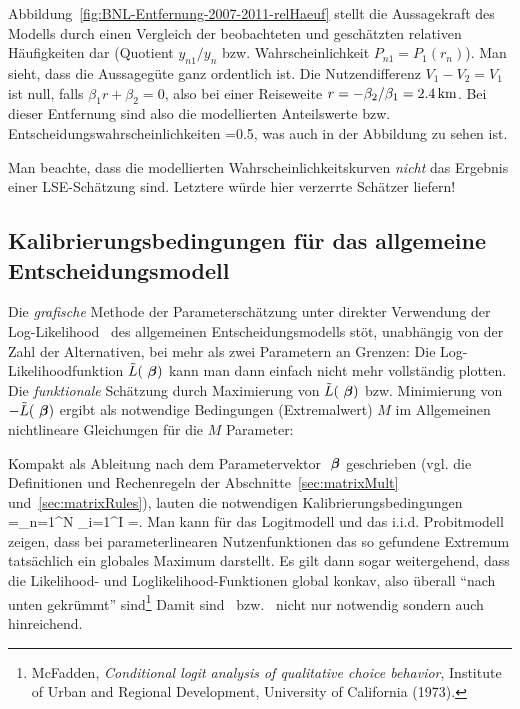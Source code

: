Abbildung~\ref{fig:BNL-Entfernung-2007-2011-relHaeuf} stellt die
Aussagekraft des Modells durch einen Vergleich der beobach\-te\-ten
und gesch\"atzten relativen
H\"aufigkeiten dar (Quotient $y_{n1}/y_n$ bzw. Wahrscheinlichkeit
$P_{n1}=P_1(r_n)$). Man sieht, dass die
Aussageg\"ute ganz ordentlich ist. Die Nutzendifferenz
 $V_1-V_2=V_1$ ist null, falls $\beta_1
  r+\beta_2=0$, also bei einer Reiseweite
  $r=-\beta_2/\beta_1=\unit[2.4]{km}$. Bei dieser Entfernung sind also
  die modellierten Anteilswerte bzw. Entscheidungswahrscheinlichkeiten
  =0.5, was auch in der Abbildung zu sehen ist. 

Man beachte, dass die modellierten Wahrscheinlichkeitskurven
\emph{nicht} das Ergebnis einer LSE-Sch\"atzung sind. Letztere w\"urde
hier verzerrte Sch\"atzer liefern!




\subsection{\label{sec:maxLikelihoodDiscr}Kalibrierungsbedingungen
f\"ur das allgemeine Entscheidungsmodell}

Die \emph{grafische} Methode der Parametersch\"atzung unter direkter Verwendung der
Log-Likelihood~ des allgemeinen Entscheidungsmodells
st\"o\3t, unabh\"angig von der Zahl der Alternativen, bei mehr als zwei
Parametern an Grenzen: Die Log-Likelihoodfunktion $\tilde{L}({\mbox{ \boldmath{$\beta$}}})$
kann man dann einfach nicht mehr
vollst\"andig plotten. Die \emph{funktionale} Sch\"atzung durch Maximierung von
$\tilde{L}({\mbox{ \boldmath{$\beta$}}})$ bzw. Minimierung von  $-\tilde{L}({\mbox{ \boldmath{$\beta$}}})$ ergibt als 
notwendige Bedingungen (Extremalwert) $M$ im Allgemeinen nichtlineare 
Gleichungen f\"ur die $M$
Parameter:

Kompakt als Ableitung nach dem Parametervektor ${\mbox{ \boldmath{$\beta$}}}$ geschrieben
(vgl. die Definitionen 
und Rechenregeln der Abschnitte~\ref{sec:matrixMult}
und~\ref{sec:matrixRules}), 
lauten die notwendigen Kalibrierungsbedingungen
\be
\label{kalibDiscrAllgVec}
\ablpart{\tilL(\vec{\beta})}{\vecbeta}=\sum\limits_{n=1}^N \sum\limits_{i=1}^I
  =.
\ee
%
Man kann f\"ur das Logitmodell und das i.i.d. Probitmodell zeigen,
dass bei parameterlinearen Nutzenfunktionen das 
so gefundene Extremum tats\"achlich ein globales Maximum
darstellt. Es gilt dann sogar weitergehend, dass die Likelihood- und
Loglikelihood-Funktionen global konkav,  also \"uberall ``nach unten
gekr\"ummt'' sind\footnote{McFadden, 
  \textit{Conditional logit analysis of qualitative choice behavior},
  Institute of Urban and Regional Development, University of
  California (1973).}  Damit sind~ bzw.~
nicht nur notwendig sondern auch hinreichend.

